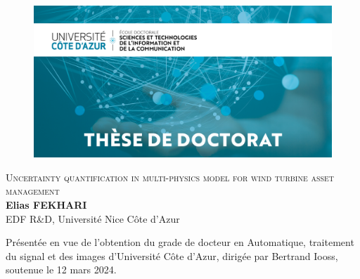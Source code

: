{\pagestyle{plain}
\begin{figure}[t]
    \vspace*{-2.7cm}
    \begin{adjustwidth}{-28mm}{-21mm}
      \includegraphics[width=\paperwidth]{./part1/figures/UCA_STIC.jpg}
    \end{adjustwidth}
  \end{figure} 

\begin{adjustwidth}{-8mm}{-8mm}
\begin{center}
  {
  {\Huge \scshape{Uncertainty quantification in multi-physics model for wind turbine asset management}}\\[20pt]
  {\Large \textbf{Elias FEKHARI}}}\\
  {\large EDF R\&D, Université Nice Côte d'Azur\\[20pt]}
\end{center}
%
\vfill
\noindent
Présentée en vue de l’obtention du grade de docteur en Automatique, traitement du signal et des images 
d’Université Côte d’Azur, dirigée par Bertrand Iooss, soutenue le 12 mars 2024.\\


\end{adjustwidth}}
